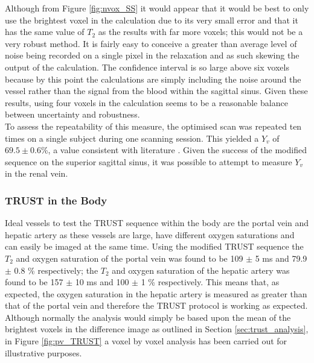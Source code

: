 Although from Figure \ref{fig:nvox_SS} it would appear that it would be best to only use the brightest voxel in the calculation due to its very small error and that it has the same value of $T_2$ as the results with far more voxels; this would not be a very robust method. It is fairly easy to conceive a greater than average level of noise being recorded on a single pixel in the relaxation and as such skewing the output of the calculation. The confidence interval is so large above six voxels because by this point the calculations are simply including the noise around the vessel rather than the signal from the blood within the sagittal sinus. Given these results, using four voxels in the calculation seems to be a reasonable balance between uncertainty and robustness.\\

To assess the repeatability of this measure, the optimised scan was repeated ten times on a single subject during one scanning session. This yielded a $Y_v$ of $69.5\pm0.6$\%, a value consistent with literature \cite{nagdyman_comparison_2005, liu_multi-site_2016}. Given the success of the modified sequence on the superior sagittal sinus, it was possible to attempt to measure $Y_v$ in the renal vein.\\

\subsubsection{\ac{TRUST} in the Body}

Ideal vessels to test the \ac{TRUST} sequence within the body are the portal vein and hepatic artery as these vessels are large, have different oxygen saturations and can easily be imaged at the same time. Using the modified \ac{TRUST} sequence the $T_2$ and oxygen saturation of the portal vein was found to be 109 $\pm$ 5 ms and 79.9 $\pm$ 0.8 \% respectively; the $T_2$ and oxygen saturation of the hepatic artery was found to be 157 $\pm$ 10 ms and 100 $\pm$ 1 \% respectively. This means that, as expected, the oxygen saturation in the hepatic artery is measured as greater than that of the portal vein and therefore the \ac{TRUST} protocol is working as expected. Although normally the analysis would simply be based upon the mean of the brightest voxels in the difference image as outlined in Section \ref{sec:trust_analysis}, in Figure \ref{fig:pv_TRUST} a voxel by voxel analysis has been carried out for illustrative purposes.\\

